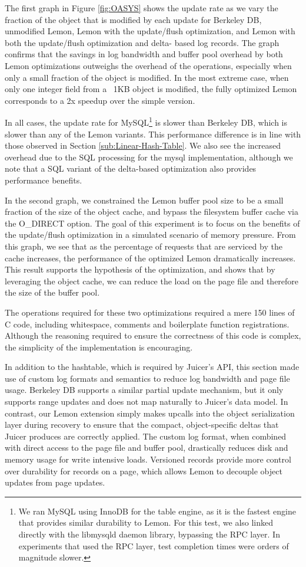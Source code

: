 \documentclass[10pt,letterpaper,twocolumn,english]{article}
\newcommand{\yad}{Lemon\xspace}
\newcommand{\oasys}{Juicer\xspace}
\begin{document}
The first graph in Figure \ref{fig:OASYS} shows the update rate as we
vary the fraction of the object that is modified by each update for
Berkeley DB, unmodified \yad, \yad with the update/flush optimization,
and \yad with both the update/flush optimization and delta- based log
records.
The graph confirms that the savings in log bandwidth and
buffer pool overhead by both \yad optimizations 
outweighs the overhead of the operations, especially when only a small
fraction of the object is modified.
In the most extreme case, when
only one integer field from a ~1KB object is modified, the fully
optimized \yad corresponds to a 2x speedup over the simple version.

In all cases, the update rate for MySQL\footnote{We ran MySQL using
InnoDB for the table engine, as it is the fastest engine that provides
similar durability to \yad. For this test, we also linked directly
with the libmysqld daemon library, bypassing the RPC layer. In
experiments that used the RPC layer, test completion times were orders
of magnitude slower.} is slower than Berkeley DB,
which is slower than any of the \yad variants. This performance
difference is in line with those observed in Section
\ref{sub:Linear-Hash-Table}. We also see the increased overhead due to
the SQL processing for the mysql implementation, although we note that
a SQL variant of the delta-based optimization also provides performance
benefits.

In the second graph, we constrained the \yad buffer pool size to be a
small fraction of the size of the object cache, and bypass the filesystem
buffer cache via the O\_DIRECT option. The goal of this experiment is to
focus on the benefits of the update/flush optimization in a simulated
scenario of memory pressure. From this graph, we see that as the percentage of
requests that are serviced by the cache increases, the
performance of the optimized \yad dramatically increases.
This result supports the hypothesis of the optimization, and
shows that by leveraging the object cache, we can reduce the load on
the page file and therefore the size of the buffer pool.

The operations required for these
two optimizations required a mere 150 lines of C code, including
whitespace, comments and boilerplate function registrations.  Although
the reasoning required to ensure the correctness of this code is
complex, the simplicity of the implementation is encouraging.

In addition to the hashtable, which is required by \oasys's API, this
section made use of custom log formats and semantics to reduce log
bandwidth and page file usage.  Berkeley DB supports a similar
partial update mechanism, but it only
supports range updates and does not map naturally to \oasys's data
model.  In contrast, our \yad extension simply makes upcalls
into the object serialization layer during recovery to ensure that the
compact, object-specific deltas that \oasys produces are correctly
applied.  The custom log format, when combined with direct access to
the page file and buffer pool, drastically reduces disk and memory usage
for write intensive loads.
Versioned records provide more control over durability for
records on a page, which allows \yad to decouple object updates from page
updates.
\end{document}
